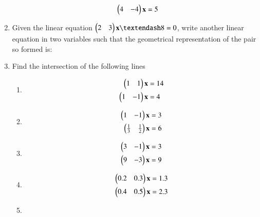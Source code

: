 \begin{enumerate}[label=\arabic*.,ref=\thesubsection.\theenumi]
\begin{enumerate}[itemsep=2pt]
\begin{align}
\begin{split}
\begin{pmatrix}4 & -4 \end{pmatrix}\mathbf{x}&=5
\end{split}
\end{align}
\end{enumerate}
%
\item Given the linear equation $\myvec{2 & 3}\vec{x} – 8 = 0$, write another linear equation in two variables such that the geometrical representation of the pair so formed is: 
%
\begin{enumerate}[itemsep=2pt]
\end{enumerate}
%
%
\item Find the intersection of the following lines
%
\begin{enumerate}[itemsep=2pt]
\item
\begin{align}
\begin{split}
\begin{pmatrix}1 & 1 \end{pmatrix}\mathbf{x}&=14
\\
\begin{pmatrix}1 & -1 \end{pmatrix}\mathbf{x}&=4
\end{split}
\end{align}
\item
\begin{align}
\begin{split}
\begin{pmatrix}1 & -1 \end{pmatrix}\mathbf{x}&=3
\\
\begin{pmatrix}\frac{1}{3} & \frac{1}{2} \end{pmatrix}\mathbf{x}&=6
\end{split}
\end{align}
\item
\begin{align}
\begin{split}
\begin{pmatrix}3 & -1 \end{pmatrix}\mathbf{x}&=3
\\
\begin{pmatrix}9 & -3 \end{pmatrix}\mathbf{x}&=9
\end{split}
\end{align}
\item
\begin{align}
\begin{split}
\begin{pmatrix}0.2 & 0.3 \end{pmatrix}\mathbf{x}&=1.3
\\
\begin{pmatrix}0.4 & 0.5 \end{pmatrix}\mathbf{x}&=2.3
\end{split}
\end{align}
\item

\end{enumerate}
\end{enumerate}
